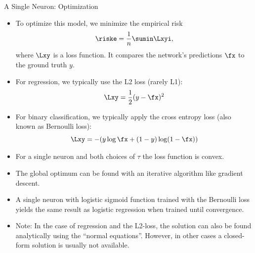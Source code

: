 \begin{vbframe} {A Single Neuron: Optimization}
\begin{itemize}
\item To optimize this model, we minimize the empirical risk 
$$\riske = \frac{1}{n} \sumin \Lxyi,$$
where $\Lxy$ is a loss function. It compares the network's predictions $\fx$ to the ground truth $y$. 
\item For regression, we typically use the L2 loss (rarely L1): $$\Lxy = \frac{1}{2}(y - \fx)^2$$
\item For binary classification, we typically apply the cross entropy loss (also known as Bernoulli loss): $$\Lxy = -(y \log \fx + (1 - y) \log(1 - \fx))$$
\framebreak 

\vspace{.5cm}
\item For a single neuron and both choices of $\tau$ the loss function is convex.
\item The global optimum can be found with an iterative algorithm like gradient descent. 
\item A single neuron with logistic sigmoid function trained with the Bernoulli loss %
 yields the %
 same result as logistic regression when trained until convergence.
\item Note: In the case of regression and the L2-loss, the solution can
also be found analytically using the “normal equations”. However, in other cases a closed-form solution is usually not available.
\end{itemize}
\end{vbframe} 

\endlecture
